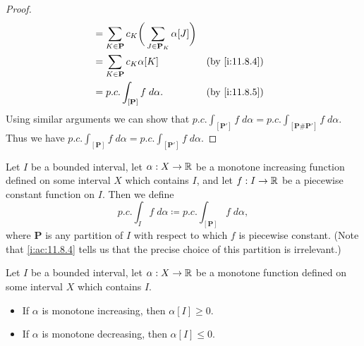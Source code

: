 \begin{proof}
\begin{align*}
                                                          & = \sum_{K \in \mathbf{P}} c_K \bigg(\sum_{J \in \mathbf{P}_K} \alpha[J]\bigg)                                      \\
                                                          & = \sum_{K \in \mathbf{P}} c_K \alpha[K]                                       &                 & \by{i:11.8.4}    \\
                                                          & = p.c. \int_{[\mathbf{P}]} f \; d \alpha.                                     &                 & \by{i:11.8.5}
  \end{align*}
  Using similar arguments we can show that \(p.c. \int_{[\mathbf{P}']} f \; d \alpha = p.c. \int_{[\mathbf{P} \# \mathbf{P}']} f \; d \alpha\).
  Thus we have \(p.c. \int_{[\mathbf{P}]} f \; d \alpha = p.c. \int_{[\mathbf{P}']} f \; d \alpha\).
\end{proof}

\begin{ac}\label{i:ac:11.8.5}
  Let \(I\) be a bounded interval, let \(\alpha : X \to \mathbb{R}\) be a monotone increasing function defined on some interval \(X\) which contains \(I\), and let \(f : I \to \mathbb{R}\) be a piecewise constant function on \(I\).
  Then we define
  \[
    p.c. \int_I f \; d \alpha \coloneqq p.c. \int_{[\mathbf{P}]} f \; d \alpha,
  \]
  where \(\mathbf{P}\) is any partition of \(I\) with respect to which \(f\) is piecewise constant.
  (Note that \cref{i:ac:11.8.4} tells us that the precise choice of this partition is irrelevant.)
\end{ac}

\begin{ac}\label{i:ac:11.8.6}
  Let \(I\) be a bounded interval, let \(\alpha : X \to \mathbb{R}\) be a monotone function defined on some interval \(X\) which contains \(I\).
  \begin{itemize}
    \item If \(\alpha\) is monotone increasing, then \(\alpha[I] \geq 0\).
    \item If \(\alpha\) is monotone decreasing, then \(\alpha[I] \leq 0\).
  \end{itemize}
\end{ac}

